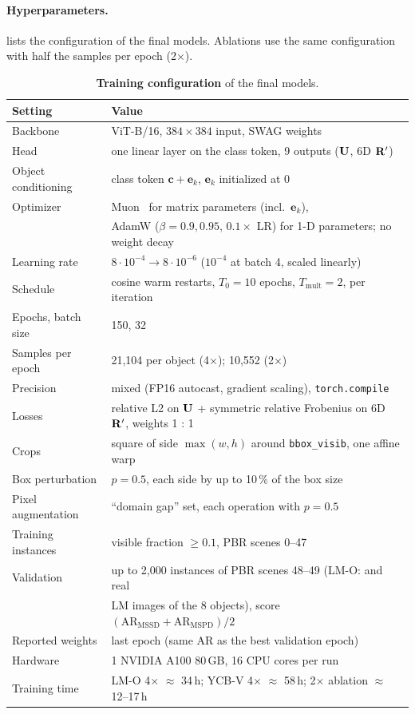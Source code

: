 \paragraph{Hyperparameters.}
 lists the configuration of the final models. Ablations use the same
configuration with half the samples per epoch (2$\times$).

\begin{table}[h]
  \centering
  \footnotesize
  \begin{tabular}{ll}
    \toprule
    Setting & Value \\
    \midrule
    Backbone & ViT-B/16, $384 \times 384$ input, SWAG weights~\cite{singh2022swag} \\
    Head & one linear layer on the class token, 9 outputs ($\mathbf{U}$, 6D $\mathbf{R}'$) \\
    Object conditioning & class token $\mathbf{c} + \mathbf{e}_k$, $\mathbf{e}_k$ initialized at 0 \\
    Optimizer & Muon~\cite{jordan2024muon} for matrix parameters (incl.\ $\mathbf{e}_k$), \\
     & AdamW ($\beta = 0.9, 0.95$, $0.1\times$ LR) for 1-D parameters; no weight decay \\
    Learning rate & $8 \cdot 10^{-4} \rightarrow 8 \cdot 10^{-6}$ ($10^{-4}$ at batch 4, scaled linearly) \\
    Schedule & cosine warm restarts, $T_0 = 10$ epochs, $T_\mathrm{mult} = 2$, per iteration \\
    Epochs, batch size & 150, 32 \\
    Samples per epoch & 21,104 per object (4$\times$); 10,552 (2$\times$) \\
    Precision & mixed (FP16 autocast, gradient scaling), \texttt{torch.compile} \\
    Losses & relative L2 on $\mathbf{U}$ + symmetric relative Frobenius on 6D $\mathbf{R}'$, weights 1 : 1 \\
    Crops & square of side $\max(w, h)$ around \texttt{bbox\_visib}, one affine warp \\
    Box perturbation & $p = 0.5$, each side by up to 10\,\% of the box size \\
    Pixel augmentation & ``domain gap'' set, each operation with $p = 0.5$ \\
    Training instances & visible fraction $\geq 0.1$, PBR scenes 0--47 \\
    Validation & up to 2,000 instances of PBR scenes 48--49 (LM-O: and real \\
     & LM images of the 8 objects), score $(\mathrm{AR}_\mathrm{MSSD} + \mathrm{AR}_\mathrm{MSPD})/2$ \\
    Reported weights & last epoch (same AR as the best validation epoch) \\
    Hardware & 1 NVIDIA A100 80\,GB, 16 CPU cores per run \\
    Training time & LM-O 4$\times$ $\approx$ 34\,h; YCB-V 4$\times$ $\approx$ 58\,h; 2$\times$ ablation $\approx$ 12--17\,h \\
    \bottomrule
  \end{tabular}
  \caption{\textbf{Training configuration} of the final models.}
  \label{tab:supp:hparams}
\end{table}

